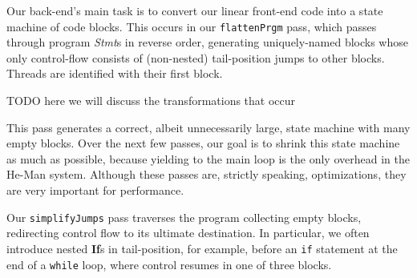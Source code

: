 \documentclass[preprint]{sigplanconf}
\renewcommand{\t}{\texttt}
\renewcommand{\b}{\textbf}
\renewcommand{\i}{\textit}
\begin{document}
Our back-end's main task is to convert our linear front-end code into a state
machine of code blocks. This occurs in our \t{flattenPrgm} pass, which passes
through program \i{Stmt}s in reverse order, generating uniquely-named blocks
whose only control-flow consists of (non-nested) tail-position jumps to other
blocks. Threads are identified with their first block.

TODO here we will discuss the transformations that occur




This pass generates a correct, albeit unnecessarily large, state machine with
many empty blocks. Over the next few passes, our goal is to shrink this state
machine as much as possible, because yielding to the main loop is the only
overhead in the He-Man system. Although these passes are, strictly speaking,
optimizations, they are very important for performance.

Our \t{simplifyJumps} pass traverses the program collecting empty blocks,
redirecting control flow to its ultimate destination. In particular, we often
introduce nested \b{If}s in tail-position, for example, before an \t{if}
statement at the end of a \t{while} loop, where control resumes in one of three
blocks.
\end{document}
